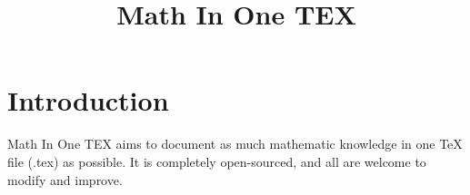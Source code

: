 \documentclass{article}
\title{Math In One TEX}
\begin{document}
    \clearpage
    \maketitle

    \clearpage
    \tableofcontents

    \clearpage
    \section{Introduction}
        Math In One TEX aims to document as much mathematic knowledge in one TeX file (.tex) as possible. It is completely open-sourced, and all are welcome to modify and improve.
\end{document}
